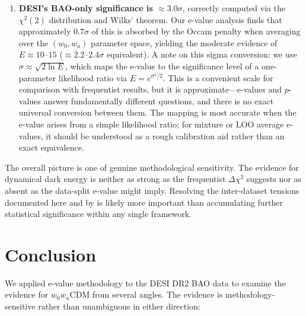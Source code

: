 \documentclass[11pt,a4paper]{article}
\begin{document}
\begin{enumerate}
    \item \textbf{DESI's BAO-only significance is $\approx 3.0\sigma$}, correctly computed via the $\chi^2(2)$ distribution and Wilks' theorem. Our e-value analysis finds that approximately $0.7\sigma$ of this is absorbed by the Occam penalty when averaging over the $(w_0, w_a)$ parameter space, yielding the moderate evidence of $E \approx 10$--$15$ ($\approx 2.2$--$2.4\sigma$ equivalent). A note on this sigma conversion: we use $\sigma \approx \sqrt{2\ln E}$, which maps the e-value to the significance level of a one-parameter likelihood ratio via $E = e^{\sigma^2/2}$. This is a convenient scale for comparison with frequentist results, but it is approximate---e-values and $p$-values answer fundamentally different questions, and there is no exact universal conversion between them. The mapping is most accurate when the e-value arises from a simple likelihood ratio; for mixture or LOO average e-values, it should be understood as a rough calibration aid rather than an exact equivalence.
\end{enumerate}

The overall picture is one of genuine methodological sensitivity. The evidence for dynamical dark energy is neither as strong as the frequentist $\Delta\chi^2$ suggests nor as absent as the data-split e-value might imply. Resolving the inter-dataset tensions documented here and by \citet{WangMota2025} is likely more important than accumulating further statistical significance within any single framework.

\section{Conclusion}
\label{sec:conclusion}

We applied e-value methodology to the DESI DR2 BAO data to examine the evidence for $w_0w_a$CDM from several angles. The evidence is methodology-sensitive rather than unambiguous in either direction:
\end{document}
